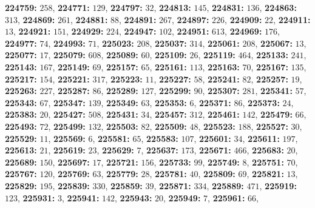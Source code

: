 \textsf{\bfseries 224759:} $258$, \textsf{\bfseries 224771:} $129$, \textsf{\bfseries 224797:} $32$, \textsf{\bfseries 224813:} $145$, \textsf{\bfseries 224831:} $136$, \textsf{\bfseries 224863:} $313$, \textsf{\bfseries 224869:} $261$, \textsf{\bfseries 224881:} $88$, \textsf{\bfseries 224891:} $267$, \textsf{\bfseries 224897:} $226$, \textsf{\bfseries 224909:} $22$, \textsf{\bfseries 224911:} $13$, \textsf{\bfseries 224921:} $151$, \textsf{\bfseries 224929:} $224$, \textsf{\bfseries 224947:} $102$, \textsf{\bfseries 224951:} $613$, \textsf{\bfseries 224969:} $176$, \textsf{\bfseries 224977:} $74$, \textsf{\bfseries 224993:} $71$, \textsf{\bfseries 225023:} $208$, \textsf{\bfseries 225037:} $314$, \textsf{\bfseries 225061:} $208$, \textsf{\bfseries 225067:} $13$, \textsf{\bfseries 225077:} $17$, \textsf{\bfseries 225079:} $608$, \textsf{\bfseries 225089:} $60$, \textsf{\bfseries 225109:} $26$, \textsf{\bfseries 225119:} $464$, \textsf{\bfseries 225133:} $241$, \textsf{\bfseries 225143:} $167$, \textsf{\bfseries 225149:} $69$, \textsf{\bfseries 225157:} $65$, \textsf{\bfseries 225161:} $113$, \textsf{\bfseries 225163:} $70$, \textsf{\bfseries 225167:} $135$, \textsf{\bfseries 225217:} $154$, \textsf{\bfseries 225221:} $317$, \textsf{\bfseries 225223:} $11$, \textsf{\bfseries 225227:} $58$, \textsf{\bfseries 225241:} $82$, \textsf{\bfseries 225257:} $19$, \textsf{\bfseries 225263:} $227$, \textsf{\bfseries 225287:} $86$, \textsf{\bfseries 225289:} $127$, \textsf{\bfseries 225299:} $90$, \textsf{\bfseries 225307:} $281$, \textsf{\bfseries 225341:} $57$, \textsf{\bfseries 225343:} $67$, \textsf{\bfseries 225347:} $139$, \textsf{\bfseries 225349:} $63$, \textsf{\bfseries 225353:} $6$, \textsf{\bfseries 225371:} $86$, \textsf{\bfseries 225373:} $24$, \textsf{\bfseries 225383:} $20$, \textsf{\bfseries 225427:} $508$, \textsf{\bfseries 225431:} $34$, \textsf{\bfseries 225457:} $312$, \textsf{\bfseries 225461:} $142$, \textsf{\bfseries 225479:} $66$, \textsf{\bfseries 225493:} $72$, \textsf{\bfseries 225499:} $132$, \textsf{\bfseries 225503:} $82$, \textsf{\bfseries 225509:} $48$, \textsf{\bfseries 225523:} $188$, \textsf{\bfseries 225527:} $30$, \textsf{\bfseries 225529:} $11$, \textsf{\bfseries 225569:} $6$, \textsf{\bfseries 225581:} $65$, \textsf{\bfseries 225583:} $107$, \textsf{\bfseries 225601:} $34$, \textsf{\bfseries 225611:} $197$, \textsf{\bfseries 225613:} $21$, \textsf{\bfseries 225619:} $23$, \textsf{\bfseries 225629:} $7$, \textsf{\bfseries 225637:} $173$, \textsf{\bfseries 225671:} $466$, \textsf{\bfseries 225683:} $20$, \textsf{\bfseries 225689:} $150$, \textsf{\bfseries 225697:} $17$, \textsf{\bfseries 225721:} $156$, \textsf{\bfseries 225733:} $99$, \textsf{\bfseries 225749:} $8$, \textsf{\bfseries 225751:} $70$, \textsf{\bfseries 225767:} $120$, \textsf{\bfseries 225769:} $63$, \textsf{\bfseries 225779:} $28$, \textsf{\bfseries 225781:} $40$, \textsf{\bfseries 225809:} $69$, \textsf{\bfseries 225821:} $13$, \textsf{\bfseries 225829:} $195$, \textsf{\bfseries 225839:} $330$, \textsf{\bfseries 225859:} $39$, \textsf{\bfseries 225871:} $334$, \textsf{\bfseries 225889:} $471$, \textsf{\bfseries 225919:} $123$, \textsf{\bfseries 225931:} $3$, \textsf{\bfseries 225941:} $142$, \textsf{\bfseries 225943:} $20$, \textsf{\bfseries 225949:} $7$, \textsf{\bfseries 225961:} $66$, 
